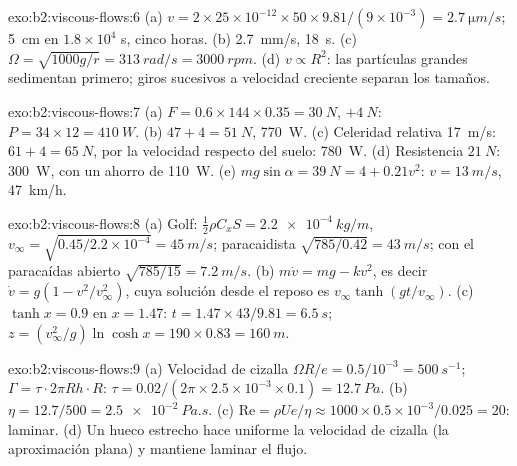 \begin{solution}{exo:b2:viscous-flows:6}
(a) $v = 2 \times 25 \times 10^{-12} \times 50 \times 9.81/(9 \times 10^{-3}) = \qty{2.7}{\micro m/s}$;
\qty{5}{cm} en $1.8 \times 10^4$ s, cinco horas. (b) \qty{2.7}{mm/s}, \qty{18}{s}. (c)
$\Omega = \sqrt{1000g/r} = \qty{313}{rad/s} = \qty{3000}{rpm}$. (d) $v \propto R^2$: las
partículas grandes sedimentan primero; giros sucesivos a velocidad
creciente separan los tamaños.
\end{solution}

\begin{solution}{exo:b2:viscous-flows:7}
(a) $F = 0.6 \times 144 \times 0.35 = \qty{30}{N}$, $+\qty{4}{N}$: $P = 34 \times 12 =
\qty{410}{W}$. (b) $47 + 4 = \qty{51}{N}$, \qty{770}{W}. (c) Celeridad relativa
\qty{17}{m/s}: $61 + 4 = \qty{65}{N}$, por la velocidad respecto del suelo: \qty{780}{W}. (d)
Resistencia $\qty{21}{N}$: \qty{300}{W}, con un ahorro de \qty{110}{W}. (e) $mg\sin\alpha = \qty{39}{N} =
4 + 0.21v^2$: $v = \qty{13}{m/s}$, \qty{47}{km/h}.
\end{solution}

\begin{solution}{exo:b2:viscous-flows:8}
(a) Golf: $\tfrac12\rho C_xS = \qty{2.2e-4}{kg/m}$, $v_\infty = \sqrt{0.45/2.2 \times 10^{-4}}
= \qty{45}{m/s}$; paracaidista $\sqrt{785/0.42} = \qty{43}{m/s}$; con el paracaídas abierto $\sqrt{785/15} =
\qty{7.2}{m/s}$. (b) $m\dot v = mg - kv^2$, es decir $\dot v = g(1 - v^2/v_\infty^2)$,
cuya solución desde el reposo es $v_\infty\tanh(gt/v_\infty)$. (c) $\tanh x = 0.9$ en
$x = 1.47$: $t = 1.47 \times 43/9.81 = \qty{6.5}{s}$; $z = (v_\infty^2/g)\ln\cosh x =
190 \times 0.83 = \qty{160}{m}$.
\end{solution}

\begin{solution}{exo:b2:viscous-flows:9}
(a) Velocidad de cizalla $\Omega R/e = 0.5/10^{-3} = \qty{500}{s^{-1}}$; $\Gamma = \tau\cdot2\pi Rh
\cdot R$: $\tau = 0.02/(2\pi \times 2.5 \times 10^{-3} \times 0.1) = \qty{12.7}{Pa}$. (b) $\eta
= 12.7/500 = \qty{2.5e-2}{Pa.s}$. (c) $\mathrm{Re} = \rho Ue/\eta \approx 1000 \times 0.5 \times
10^{-3}/0.025 = 20$: laminar. (d) Un hueco estrecho hace uniforme la
velocidad de cizalla (la aproximación plana) y mantiene laminar el flujo.
\end{solution}

